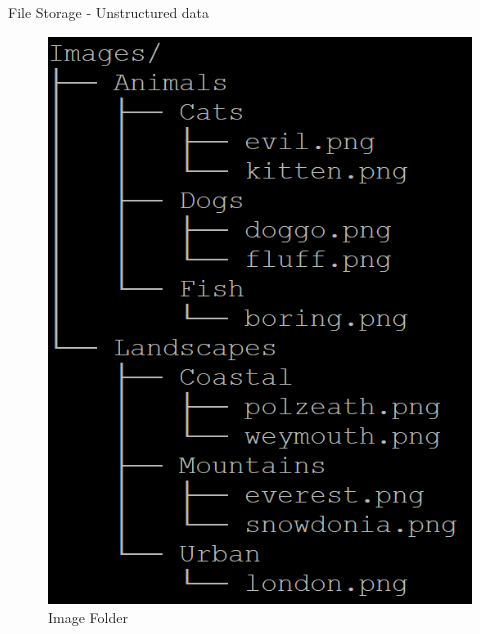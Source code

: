 \begin{frame}{File Storage - Unstructured data}
    \begin{figure}
        \centering
        \includegraphics[width=\textwidth,height=0.7\textheight,keepaspectratio]{img/image-tree.png}
        \caption{Image Folder}
        \label{fig:my_label}
    \end{figure}  
\end{frame}


